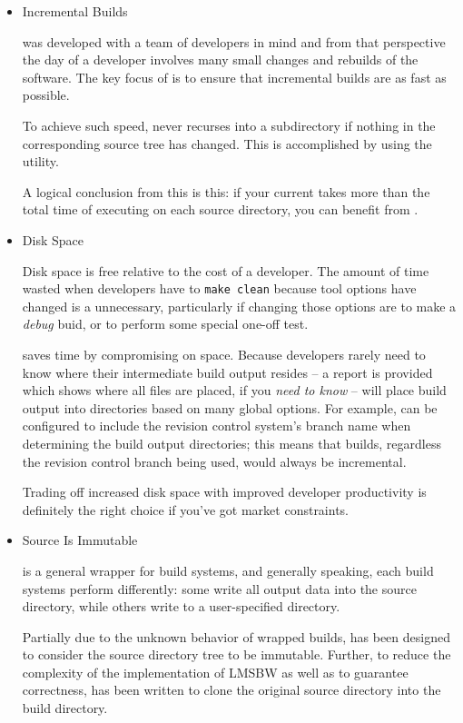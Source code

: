 \begin{itemize}
\item Incremental Builds

  \lmsbw was developed with a team of developers in mind and from that
  perspective the day of a developer involves many small changes and
  rebuilds of the software.  The key focus of \lmsbw is to ensure that
  incremental builds are as fast as possible.

  To achieve such speed, \lmsbw never recurses into a subdirectory if
  nothing in the corresponding source tree has changed.  This is
  accomplished by using the \mtree utility.  

  A logical conclusion from this is this: if your current \nullbuild
  takes more than the total time of executing \mtree on each source
  directory, you can benefit from \lmsbw.

\item Disk Space

  Disk space is free relative to the cost of a developer.  The amount
  of time wasted when developers have to \texttt{make clean} because
  tool options have changed is a unnecessary, particularly if changing
  those options are to make a \emph{debug} buid, or to perform some
  special one-off test.

  \lmsbw saves time by compromising on space.  Because developers
  rarely need to know where their intermediate build output resides --
  a report is provided which shows where all files are placed, if you
  \emph{need to know} -- \lmsbw will place build output into
  directories based on many global options.  For example, \lmsbw can
  be configured to include the revision control system's branch name
  when determining the build output directories; this means that
  builds, regardless the revision control branch being used, would
  always be incremental.

  Trading off increased disk space with improved developer
  productivity is definitely the right choice if you've got market
  constraints.

\item Source Is Immutable

  \lmsbw is a general wrapper for build systems, and generally
  speaking, each build systems perform differently: some write all
  output data into the source directory, while others write to a
  user-specified directory.

  Partially due to the unknown behavior of wrapped builds, \lmsbw has
  been designed to consider the source directory tree to be immutable.
  Further, to reduce the complexity of the implementation of LMSBW as
  well as to guarantee correctness, \lmsbw has been written to clone
  the original source directory into the build directory.


\end{itemize}
